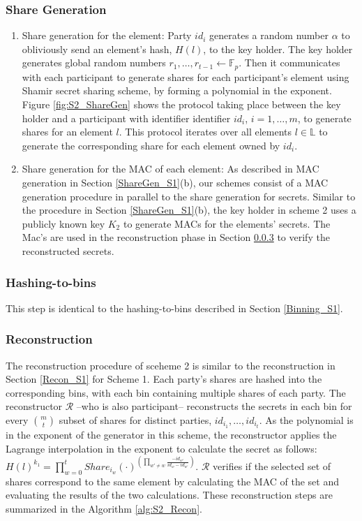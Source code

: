 \subsubsection{Share Generation}\label{ShareGen_S2}
\begin{enumerate}[label=(\alph*)]
    \item Share generation for the element: Party $id_i$ generates a random number $\alpha$ to obliviously send an element's hash, $H(l)$, to the key holder. The key holder generates global random numbers $r_1, \dots, r_{t-1} \gets \mathbb{F}_p$. Then it communicates with each participant to generate shares for each participant's element using Shamir secret sharing scheme, by forming a polynomial in the exponent. Figure \ref{fig:S2_ShareGen} shows the protocol taking place between the key holder and a participant with identifier identifier $id_i$, $i =1, \dots, m$, to generate shares for an element $l$. This protocol iterates over all elements $l \in \mathbb{L}$ to generate the corresponding share for each element owned by $id_i$.
    \item Share generation for the MAC of each element: As described in MAC generation in Section \ref{ShareGen_S1}(b), our schemes consist of a MAC generation procedure in parallel to the share generation for secrets. Similar to the procedure in  Section \ref{ShareGen_S1}(b), the key holder in scheme 2 uses a publicly known key $K_2$ to generate MACs for the elements' secrets. The Mac's are used in the reconstruction phase in Section \ref{Recon_S2} to verify the reconstructed secrets. 
\end{enumerate}

\subsubsection{Hashing-to-bins}\label{Binning_S2} This step is identical to the hashing-to-bins described in Section \ref{Binning_S1}.

\subsubsection{Reconstruction}\label{Recon_S2}
The reconstruction procedure of sceheme 2 is similar to the reconstruction in Section \ref{Recon_S1} for Scheme 1. Each party's shares are hashed into the corresponding bins, with each bin containing multiple shares of each party. The reconstructor $\mathcal{R}$ --who is also participant-- reconstructs the secrets in each bin for every $m \choose t$ subset of shares for distinct parties, $id_{i_1}, \dots, id_{i_t}$. As the polynomial is in the exponent of the generator in this scheme, the reconstructor applies the Lagrange interpolation in the exponent to calculate the secret as follows: $H(l)^{k_1} = \prod^t_{w=0} Share_{i_w}(\cdot)^{(\prod_{w' \neq w} \frac{-id_{w'}}{id_w - id_{w'}})}$. $\mathcal{R}$ verifies if the selected set of shares correspond to the same element by calculating the MAC of the set and evaluating the results of the two calculations. These reconstruction steps are summarized in the Algorithm \ref{alg:S2_Recon}. 

